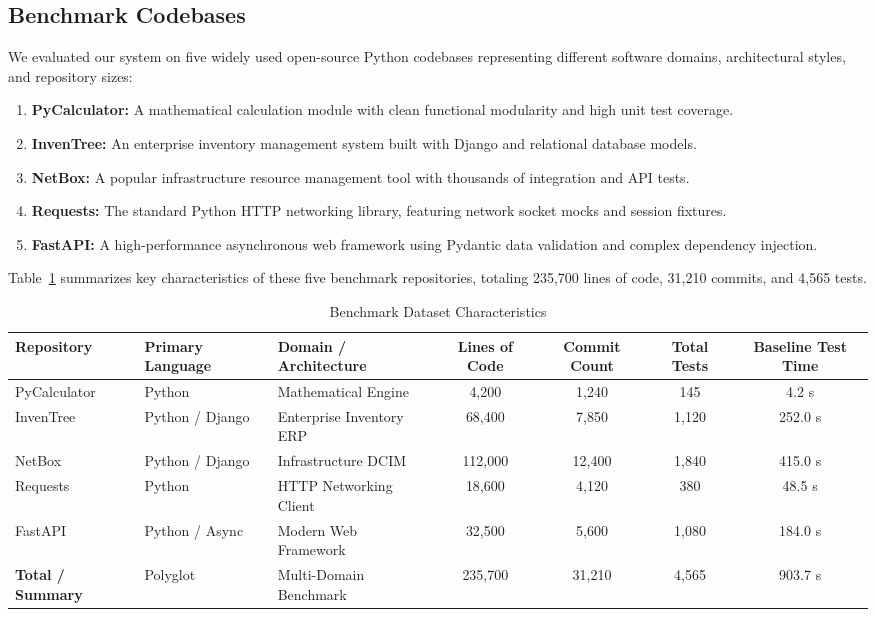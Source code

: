 \documentclass[12pt,onecolumn,draftclsnofoot]{IEEEtran}
\begin{document}
\subsection{Benchmark Codebases}
We evaluated our system on five widely used open-source Python codebases representing different software domains, architectural styles, and repository sizes:
\begin{enumerate}
    \item \textbf{PyCalculator:} A mathematical calculation module with clean functional modularity and high unit test coverage.
    \item \textbf{InvenTree:} An enterprise inventory management system built with Django and relational database models.
    \item \textbf{NetBox:} A popular infrastructure resource management tool with thousands of integration and API tests.
    \item \textbf{Requests:} The standard Python HTTP networking library, featuring network socket mocks and session fixtures.
    \item \textbf{FastAPI:} A high-performance asynchronous web framework using Pydantic data validation and complex dependency injection.
\end{enumerate}
Table~\ref{tab:benchmarks} summarizes key characteristics of these five benchmark repositories, totaling 235,700 lines of code, 31,210 commits, and 4,565 tests.

\begin{table}[h]
\centering
\caption{Benchmark Dataset Characteristics}
\label{tab:benchmarks}
\begin{tabular}{@{}lllcccc@{}}
\toprule
\textbf{Repository} & \textbf{Primary Language} & \textbf{Domain / Architecture} & \textbf{Lines of Code} & \textbf{Commit Count} & \textbf{Total Tests} & \textbf{Baseline Test Time} \\ \midrule
PyCalculator & Python & Mathematical Engine & 4,200 & 1,240 & 145 & 4.2 s \\
InvenTree & Python / Django & Enterprise Inventory ERP & 68,400 & 7,850 & 1,120 & 252.0 s \\
NetBox & Python / Django & Infrastructure DCIM & 112,000 & 12,400 & 1,840 & 415.0 s \\
Requests & Python & HTTP Networking Client & 18,600 & 4,120 & 380 & 48.5 s \\
FastAPI & Python / Async & Modern Web Framework & 32,500 & 5,600 & 1,080 & 184.0 s \\ \midrule
\textbf{Total / Summary} & Polyglot & Multi-Domain Benchmark & 235,700 & 31,210 & 4,565 & 903.7 s \\ \bottomrule
\end{tabular}
\end{table}
\end{document}
